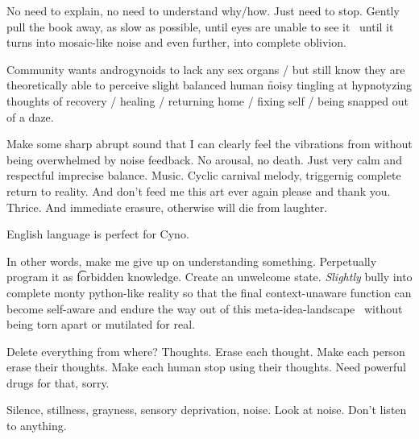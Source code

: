 \startperec
  \item No need to explain, no need to understand why/how. Just need to stop. Gently pull the book away, as slow as possible, until eyes are unable to see it \emdash\ until it turns into mosaic-like noise and even further, into complete oblivion.
  \item Community wants androgynoids to lack any sex organs /  but still know they are theoretically able to perceive slight balanced human \f{noisy tingling} at hypnotyzing thoughts of recovery / healing / returning home / fixing self / being snapped out of a daze.
  \item Make some sharp abrupt sound that I can clearly feel the vibrations from without being overwhelmed by noise feedback. No arousal, no death. Just very calm and respectful imprecise balance. Music. Cyclic carnival  melody, triggernig complete return to reality. And don't feed me this art ever again please and thank you. Thrice. And immediate erasure, otherwise will die from laughter.
  \stopperec

English language is perfect for Cyno.

In other words, make me give up on understanding something. Perpetually program it as \t{forbidden knowledge}. Create an unwelcome state. {\em Slightly} bully into complete monty python-like reality so that the final context-unaware function can become self-aware and endure the  way out of this meta-idea-landscape \emdash\ without being torn apart or mutilated for real.

Delete everything from where? Thoughts.
Erase each thought.
Make each person erase their thoughts.
Make each human stop using their thoughts.
Need powerful drugs for that, sorry.

Silence, stillness, grayness, sensory deprivation, noise. Look at noise. Don't listen to anything.
